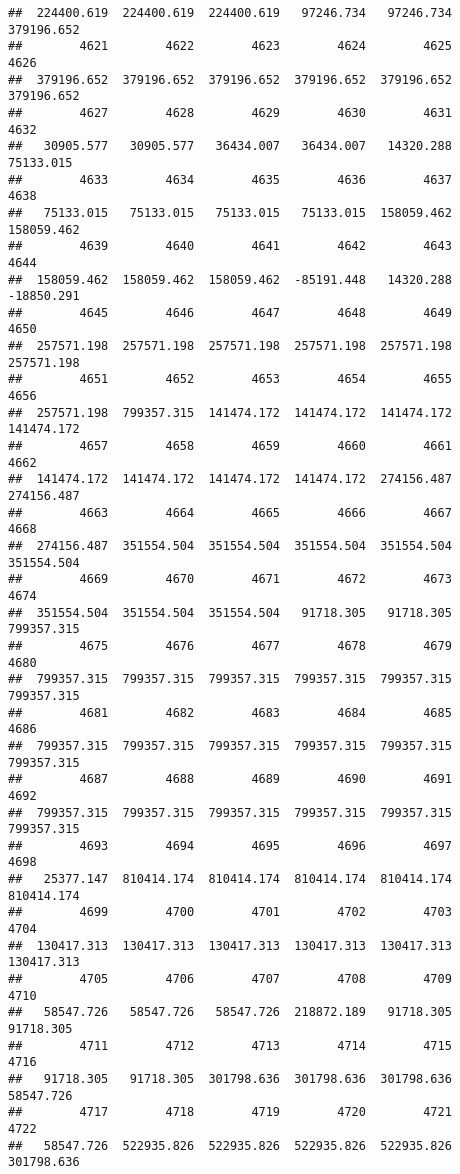 \documentclass[
]{book}
\begin{document}
\begin{verbatim}
##  224400.619  224400.619  224400.619   97246.734   97246.734  379196.652 
##        4621        4622        4623        4624        4625        4626 
##  379196.652  379196.652  379196.652  379196.652  379196.652  379196.652 
##        4627        4628        4629        4630        4631        4632 
##   30905.577   30905.577   36434.007   36434.007   14320.288   75133.015 
##        4633        4634        4635        4636        4637        4638 
##   75133.015   75133.015   75133.015   75133.015  158059.462  158059.462 
##        4639        4640        4641        4642        4643        4644 
##  158059.462  158059.462  158059.462  -85191.448   14320.288  -18850.291 
##        4645        4646        4647        4648        4649        4650 
##  257571.198  257571.198  257571.198  257571.198  257571.198  257571.198 
##        4651        4652        4653        4654        4655        4656 
##  257571.198  799357.315  141474.172  141474.172  141474.172  141474.172 
##        4657        4658        4659        4660        4661        4662 
##  141474.172  141474.172  141474.172  141474.172  274156.487  274156.487 
##        4663        4664        4665        4666        4667        4668 
##  274156.487  351554.504  351554.504  351554.504  351554.504  351554.504 
##        4669        4670        4671        4672        4673        4674 
##  351554.504  351554.504  351554.504   91718.305   91718.305  799357.315 
##        4675        4676        4677        4678        4679        4680 
##  799357.315  799357.315  799357.315  799357.315  799357.315  799357.315 
##        4681        4682        4683        4684        4685        4686 
##  799357.315  799357.315  799357.315  799357.315  799357.315  799357.315 
##        4687        4688        4689        4690        4691        4692 
##  799357.315  799357.315  799357.315  799357.315  799357.315  799357.315 
##        4693        4694        4695        4696        4697        4698 
##   25377.147  810414.174  810414.174  810414.174  810414.174  810414.174 
##        4699        4700        4701        4702        4703        4704 
##  130417.313  130417.313  130417.313  130417.313  130417.313  130417.313 
##        4705        4706        4707        4708        4709        4710 
##   58547.726   58547.726   58547.726  218872.189   91718.305   91718.305 
##        4711        4712        4713        4714        4715        4716 
##   91718.305   91718.305  301798.636  301798.636  301798.636   58547.726 
##        4717        4718        4719        4720        4721        4722 
##   58547.726  522935.826  522935.826  522935.826  522935.826  301798.636 

\end{verbatim}
\end{document}
